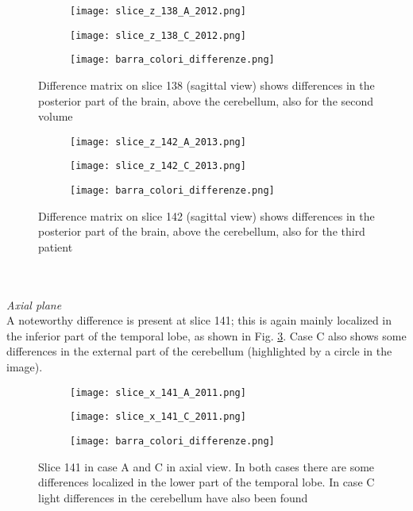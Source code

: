 \documentclass{article}
\begin{document}
%
%
	\begin{figure} [h!]
		\centering
		\begin{subfigure} [b] {0.45\linewidth} 				\texttt{[image: slice\_z\_138\_A\_2012.png]}
		\end{subfigure}
		\hfill
		\begin{subfigure} [b] {0.45\linewidth} \texttt{[image: slice\_z\_138\_C\_2012.png]}
		\end{subfigure}
		\begin{subfigure} [b] {0.08\linewidth} \texttt{[image: barra\_colori\_differenze.png]}
		\end{subfigure}
		\caption{Difference matrix on slice 138 (sagittal view) shows differences in the posterior part of the brain, above the cerebellum, also for the second volume}
		\label{Fig: slices_138_2012_casi}
	\end{figure}
%
	\begin{figure} [h!]
		\centering
		\begin{subfigure} [b] {0.45\linewidth} 				\texttt{[image: slice\_z\_142\_A\_2013.png]}
		\end{subfigure}
		\hfill
		\begin{subfigure} [b] {0.45\linewidth} \texttt{[image: slice\_z\_142\_C\_2013.png]}
		\end{subfigure}
		\begin{subfigure} [b] {0.08\linewidth} \texttt{[image: barra\_colori\_differenze.png]}
		\end{subfigure}
		\caption{Difference matrix on slice 142 (sagittal view) shows differences in the posterior part of the brain, above the cerebellum, also for the third patient}
		\label{Fig: slices_142_2013_casi}
	\end{figure}
	\\
	\\
	\textit{Axial plane}
	\\
	A noteworthy difference is present at slice 141; this is again mainly localized in the inferior part of the temporal lobe, as shown in Fig. \ref{Fig: slices_141_casi}. Case C also shows some differences in the external part of the cerebellum (highlighted by a circle in the image).
	\begin{figure} [h!]
		\centering
		\begin{subfigure} [b] {0.45\linewidth} 				\texttt{[image: slice\_x\_141\_A\_2011.png]}
		\end{subfigure}
		\hfill
		\begin{subfigure} [b] {0.45\linewidth} \texttt{[image: slice\_x\_141\_C\_2011.png]}
		\end{subfigure}
		\begin{subfigure} [b] {0.08\linewidth} \texttt{[image: barra\_colori\_differenze.png]}
		\end{subfigure}
		\caption{Slice 141 in case A and C in axial view. In both cases there are some differences localized in the lower part of the temporal lobe. In case C light differences in the cerebellum have also been found}
		\label{Fig: slices_141_casi}
	\end{figure}
\end{document}
